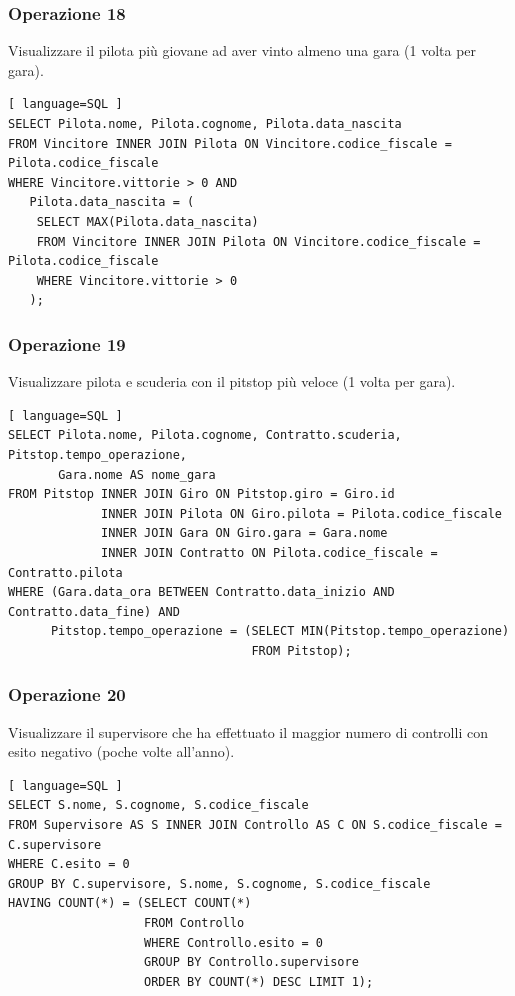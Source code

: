 \documentclass[11pt]{article}
\begin{document}
\subsubsection{Operazione 18}
Visualizzare il pilota più giovane ad aver vinto almeno una gara (1 volta per gara).
\begin{lstlisting}[ language=SQL ]
SELECT Pilota.nome, Pilota.cognome, Pilota.data_nascita
FROM Vincitore INNER JOIN Pilota ON Vincitore.codice_fiscale = Pilota.codice_fiscale
WHERE Vincitore.vittorie > 0 AND
   Pilota.data_nascita = (
    SELECT MAX(Pilota.data_nascita)
    FROM Vincitore INNER JOIN Pilota ON Vincitore.codice_fiscale = Pilota.codice_fiscale
    WHERE Vincitore.vittorie > 0
   );
\end{lstlisting}


\subsubsection{Operazione 19}
Visualizzare pilota e scuderia con il pitstop più veloce (1 volta per gara).
\begin{lstlisting}[ language=SQL ]
SELECT Pilota.nome, Pilota.cognome, Contratto.scuderia, Pitstop.tempo_operazione, 
       Gara.nome AS nome_gara
FROM Pitstop INNER JOIN Giro ON Pitstop.giro = Giro.id
             INNER JOIN Pilota ON Giro.pilota = Pilota.codice_fiscale
             INNER JOIN Gara ON Giro.gara = Gara.nome
             INNER JOIN Contratto ON Pilota.codice_fiscale = Contratto.pilota
WHERE (Gara.data_ora BETWEEN Contratto.data_inizio AND Contratto.data_fine) AND
      Pitstop.tempo_operazione = (SELECT MIN(Pitstop.tempo_operazione)
                                  FROM Pitstop);
\end{lstlisting}


\subsubsection{Operazione 20}
Visualizzare il supervisore che ha effettuato il maggior numero di controlli con esito negativo (poche volte all'anno).
\begin{lstlisting}[ language=SQL ]
SELECT S.nome, S.cognome, S.codice_fiscale
FROM Supervisore AS S INNER JOIN Controllo AS C ON S.codice_fiscale = C.supervisore
WHERE C.esito = 0
GROUP BY C.supervisore, S.nome, S.cognome, S.codice_fiscale
HAVING COUNT(*) = (SELECT COUNT(*)
                   FROM Controllo
                   WHERE Controllo.esito = 0
                   GROUP BY Controllo.supervisore
                   ORDER BY COUNT(*) DESC LIMIT 1);
\end{lstlisting}
\end{document}
